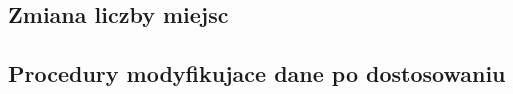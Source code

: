\documentclass[12pt]{article}
\begin{document}
\subsection{Zmiana liczby miejsc}


\subsection{Procedury modyfikujace dane po dostosowaniu}



\end{document}
